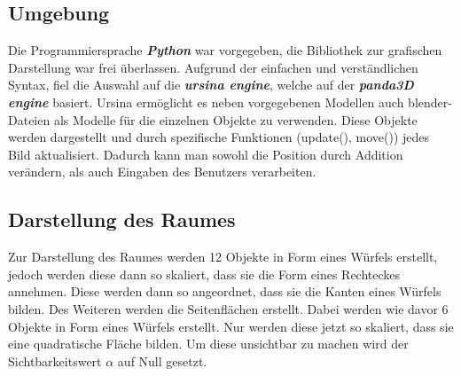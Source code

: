 \documentclass[a4paper, 12pt]{article}
\begin{document}
	\subsection{Umgebung}
		Die Programmiersprache \emph{\textbf{Python}} war vorgegeben, die Bibliothek zur grafischen Darstellung war frei überlassen. Aufgrund der einfachen und verständlichen Syntax, fiel die Auswahl auf die \emph{\textbf{ursina engine}}, welche auf der \emph{\textbf{panda3D engine}} basiert. Ursina ermöglicht es neben vorgegebenen Modellen auch blender-Dateien als Modelle für die einzelnen Objekte zu verwenden. Diese Objekte werden dargestellt und durch spezifische Funktionen (update(), move()) jedes Bild aktualisiert. Dadurch kann man sowohl die Position durch Addition verändern, als auch Eingaben des Benutzers verarbeiten. 
	
	\subsection{Darstellung des Raumes}
		Zur Darstellung des Raumes werden 12 Objekte in Form eines Würfels erstellt, jedoch werden diese dann so skaliert, dass sie die Form eines Rechteckes annehmen. Diese werden dann so angeordnet, dass sie die Kanten eines Würfels bilden. 
		Des Weiteren werden die Seitenflächen erstellt. Dabei werden wie davor 6 Objekte in Form eines Würfels erstellt. Nur werden diese jetzt so skaliert, dass sie eine quadratische Fläche bilden. Um diese unsichtbar zu machen wird der Sichtbarkeitswert $\alpha$ auf Null gesetzt.
		
\end{document}

